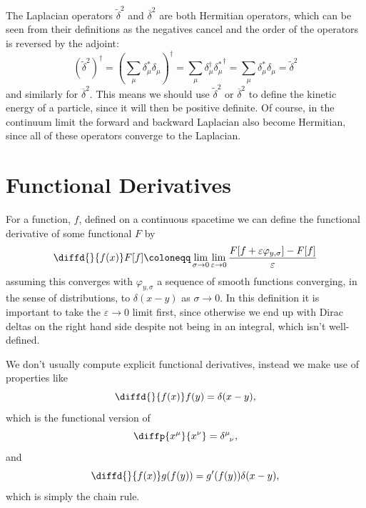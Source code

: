 \documentclass[fleqn]{NotesClass}
\newcommand{\hermit}{\dagger}
\newcommand{\forwardDerivative}{\delta}
\newcommand{\backwardDerivative}{\delta^*}
\newcommand{\centralLaplacian}{{\overbar{\delta}^2}}
\newcommand{\mixedLaplacian}{{\widetilde{\delta}^2}}
\begin{document}
    The Laplacian operators \(\mixedLaplacian\) and \(\centralLaplacian\) are both Hermitian operators, which can be seen from their definitions as the negatives cancel and the order of the operators is reversed by the adjoint:
    \begin{equation}
        (\mixedLaplacian)^{\hermit} = \left( \sum_\mu \backwardDerivative_\mu \forwardDerivative_\mu \right)^\hermit = \sum_\mu \forwardDerivative_\mu^\hermit {\backwardDerivative_\mu}^\hermit = \sum_\mu \backwardDerivative_\mu \forwardDerivative_\mu = \mixedLaplacian
    \end{equation}
    and similarly for \(\centralLaplacian\).
    This means we should use \(\mixedLaplacian\) or \(\centralLaplacian\) to define the kinetic energy of a particle, since it will then be positive definite.
    Of course, in the continuum limit the forward and backward Laplacian also become Hermitian, since all of these operators converge to the Laplacian.
    
    \section{Functional Derivatives}
    For a function, \(f\), defined on a continuous spacetime we can define the functional derivative of some functional \(F\) by
    \begin{equation}
        \diffd{}{f(x)}F[f] \coloneqq \lim_{\sigma \to 0} \lim_{\varepsilon \to 0} \frac{F[f + \varepsilon\varphi_{y,\sigma}] - F[f]}{\varepsilon}
    \end{equation}
    assuming this converges with \(\varphi_{y,\sigma}\) a sequence of smooth functions converging, in the sense of distributions, to \(\delta(x - y)\) as \(\sigma \to 0\).
    In this definition it is important to take the \(\varepsilon \to 0\) limit first, since otherwise we end up with Dirac deltas on the right hand side despite not being in an integral, which isn't well-defined.
    
    We don't usually compute explicit functional derivatives, instead we make use of properties like
    \begin{equation}
        \diffd{}{f(x)}f(y) = \delta(x - y),
    \end{equation}
    which is the functional version of
    \begin{equation}
        \diffp{x^\mu}{x^\nu} = \tensor{\delta}{^\mu_\nu},
    \end{equation}
    and
    \begin{equation}
        \diffd{}{f(x)}g(f(y)) = g'(f(y))\delta(x - y),
    \end{equation}
    which is simply the chain rule.
    
\end{document}
